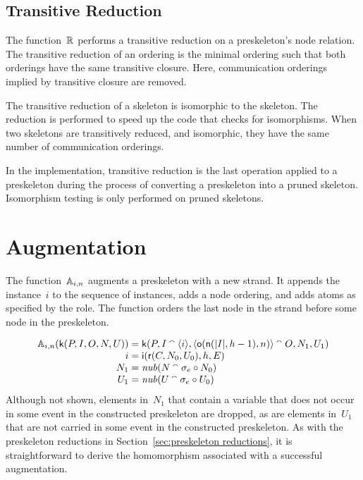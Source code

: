 \documentclass[12pt]{report}
\theoremstyle{definition}
\begin{document}
\subsection{Transitive Reduction}

The function~$\mathbb R$ performs a transitive reduction on a preskeleton's
node relation.  The transitive reduction
of an ordering is the minimal ordering such that both orderings have
the same transitive closure.  Here, communication orderings implied by
transitive closure are removed.

The transitive reduction of a skeleton is isomorphic to the skeleton.
The reduction is performed to speed up the code that checks for
isomorphisms.  When two skeletons are transitively reduced, and
isomorphic, they have the same number of communication orderings.

In the implementation, transitive reduction is the last operation
applied to a preskeleton during the process of converting a
preskeleton into a pruned skeleton.  Isomorphism testing is only
performed on pruned skeletons.

\section{Augmentation}

The function~$\mathbb A_{i,n}$ augments a preskeleton with a new strand.
It appends the instance~$i$ to the sequence of instances, adds a node
ordering, and adds atoms as specified by the role.  The function
orders the last node in the strand before some node in the
preskeleton.

$$
\begin{array}{r@{}c@{}l}
\ops{A}_{i,n}(\cn{k}(P, I, O, N, U))&{}={}&
\cn{k}(P, I\append\langle i\rangle,
\langle \cn{o}(\cn{n}(|I|,h-1),n)
\rangle \append O,N_1, U_1)\\
i&{}={}&\cn{i}(\cn{r}(C,N_0,U_0),h,E)\\
N_1&{}={}&\fn{nub}(N\append\sigma_e\circ N_0)\\
U_1&{}={}&\fn{nub}(U\append\sigma_e\circ U_0)
\end{array}
$$ Although not shown, elements in~$N_1$ that contain a variable that
does not occur in some event in the constructed preskeleton
are dropped, as are elements in~$U_1$ that are not carried in some
event in the constructed preskeleton.  As with the preskeleton
reductions in Section~\ref{sec:preskeleton reductions}, it is
straightforward to derive the homomorphism associated with a
successful augmentation.
\end{document}
